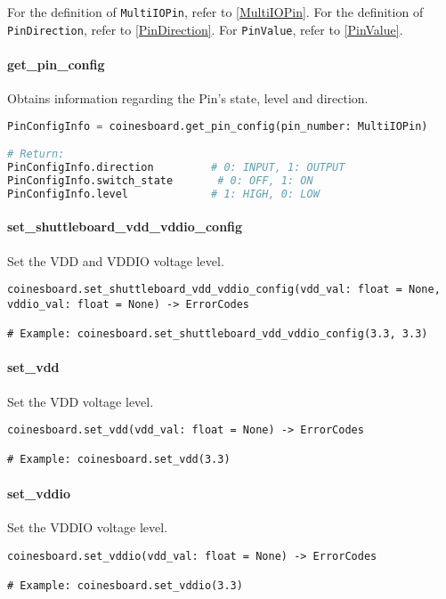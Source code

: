 For the definition of \texttt{MultiIOPin}, refer to \ref{MultiIOPin}. For the definition of \texttt{PinDirection}, refer to \ref{PinDirection}.
For \texttt{PinValue}, refer to \ref{PinValue}.

\paragraph{get\_pin\_config}
Obtains information regarding the Pin's state, level and direction.

\begin{lstlisting}[language=python]
PinConfigInfo = coinesboard.get_pin_config(pin_number: MultiIOPin)

# Return:
PinConfigInfo.direction         # 0: INPUT, 1: OUTPUT
PinConfigInfo.switch_state       # 0: OFF, 1: ON
PinConfigInfo.level             # 1: HIGH, 0: LOW
\end{lstlisting}

\paragraph{set\_shuttleboard\_vdd\_vddio\_config}

Set the VDD and VDDIO voltage level.

\begin{lstlisting}
coinesboard.set_shuttleboard_vdd_vddio_config(vdd_val: float = None, vddio_val: float = None) -> ErrorCodes

# Example: coinesboard.set_shuttleboard_vdd_vddio_config(3.3, 3.3)
\end{lstlisting}

\paragraph{set\_vdd}

Set the VDD voltage level.

\begin{lstlisting}
coinesboard.set_vdd(vdd_val: float = None) -> ErrorCodes

# Example: coinesboard.set_vdd(3.3)
\end{lstlisting}

\paragraph{set\_vddio}

Set the VDDIO voltage level.

\begin{lstlisting}
coinesboard.set_vddio(vdd_val: float = None) -> ErrorCodes

# Example: coinesboard.set_vddio(3.3)
\end{lstlisting}

